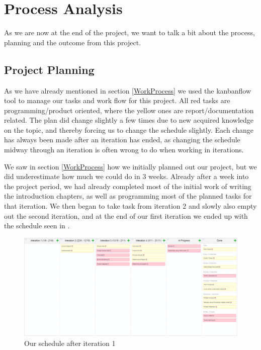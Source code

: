 \chapter{Process Analysis}

As we are now at the end of the project, we want to talk a bit about the process, planning and the outcome from this project.


\section{Project Planning}
\label{ProjectPlanning}
As we have already mentioned in section \ref{WorkProcess} we used the kanbanflow tool to manage our tasks and work flow for this project. All red tasks are programming/product oriented, where the yellow ones are report/documentation related. The plan did change slightly a few times due to new acquired knowledge on the topic, and thereby forcing us to change the schedule slightly. Each change has always been made after an iteration has ended, as changing the schedule midway through an iteration is often wrong to do when working in iterations.

We saw in section \ref{WorkProcess} how we initially planned out our project, but we did underestimate how much we could do in 3 weeks. Already after a week into the project period, we had already completed most of the initial work of writing the introduction chapters, as well as programming most of the planned tasks for that iteration. We then began to take task from iteration 2 and slowly also empty out the second iteration, and at the end of our first iteration we ended up with the schedule seen in .

\begin{figure}[H]
	\includegraphics[width=1.0\linewidth]{img/afteriteration1}
	\centering
	\caption{Our schedule after iteration 1}
	\label{fig:afteritration1}
\end{figure}

